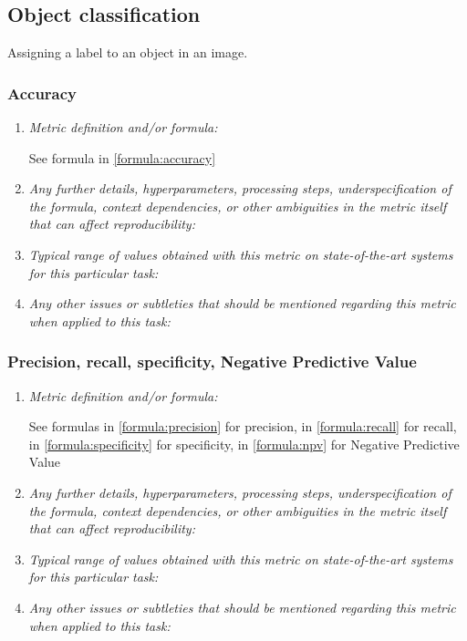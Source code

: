 \documentclass[a4paper,11pt]{article}
\begin{document}
    \subsection{Object classification}
        Assigning a label to an object in an image.
        \subsubsection{Accuracy}
            \begin{enumerate}[label=\alph*.]
                \item \textit{Metric definition and/or formula:}

                See formula in \ref{formula:accuracy}
                \bigskip
                \item \textit{Any further details, hyperparameters, processing steps, underspecification of the formula, context dependencies, or other ambiguities in the metric itself that can affect reproducibility:}
                \bigskip
                \item \textit{Typical range of values obtained with this metric on state-of-the-art systems for this particular task:}
                \bigskip
                \item \textit{Any other issues or subtleties that should be mentioned regarding this metric when applied to this task:}
                \bigskip
            \end{enumerate}
        \subsubsection{Precision, recall, specificity, Negative Predictive Value}
            \begin{enumerate}[label=\alph*.]
                \item \textit{Metric definition and/or formula:}

                See formulas in \ref{formula:precision} for precision, in \ref{formula:recall} for recall, in \ref{formula:specificity} for specificity, in \ref{formula:npv} for Negative Predictive Value
                \bigskip
                \item \textit{Any further details, hyperparameters, processing steps, underspecification of the formula, context dependencies, or other ambiguities in the metric itself that can affect reproducibility:}
                \bigskip
                \item \textit{Typical range of values obtained with this metric on state-of-the-art systems for this particular task:}
                \bigskip
                \item \textit{Any other issues or subtleties that should be mentioned regarding this metric when applied to this task:}
                \bigskip
            \end{enumerate}
\end{document}
